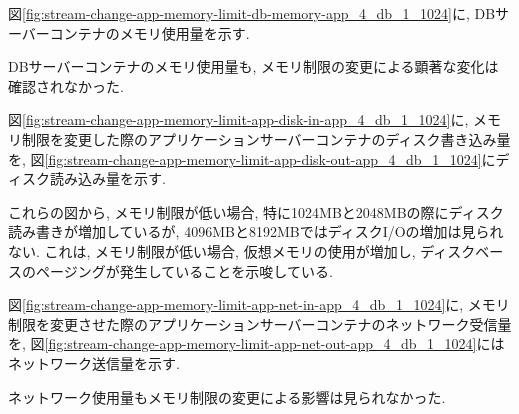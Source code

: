 \documentclass[../../../../main]{subfiles}
\begin{document}
    図\ref{fig:stream-change-app-memory-limit-db-memory-app_4_db_1_1024}に, DBサーバーコンテナのメモリ使用量を示す.

    

    DBサーバーコンテナのメモリ使用量も, メモリ制限の変更による顕著な変化は確認されなかった.


    図\ref{fig:stream-change-app-memory-limit-app-disk-in-app_4_db_1_1024}に, メモリ制限を変更した際のアプリケーションサーバーコンテナのディスク書き込み量を, 図\ref{fig:stream-change-app-memory-limit-app-disk-out-app_4_db_1_1024}にディスク読み込み量を示す.

    
    

    これらの図から, メモリ制限が低い場合, 特に1024MBと2048MBの際にディスク読み書きが増加しているが, 4096MBと8192MBではディスクI/Oの増加は見られない. これは, メモリ制限が低い場合, 仮想メモリの使用が増加し, ディスクベースのページングが発生していることを示唆している.


    図\ref{fig:stream-change-app-memory-limit-app-net-in-app_4_db_1_1024}に, メモリ制限を変更させた際のアプリケーションサーバーコンテナのネットワーク受信量を, 図\ref{fig:stream-change-app-memory-limit-app-net-out-app_4_db_1_1024}にはネットワーク送信量を示す.

    
    

    ネットワーク使用量もメモリ制限の変更による影響は見られなかった.
\end{document}
